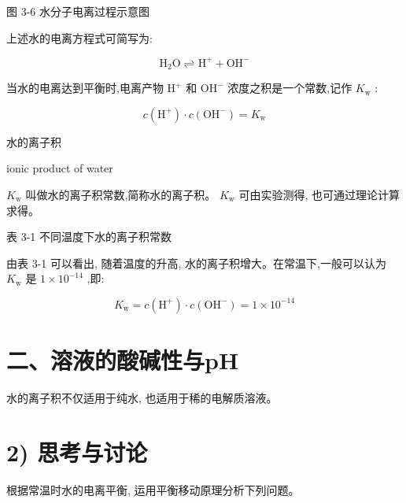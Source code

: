 \documentclass[10pt]{article}
\begin{document}
图 3-6 水分子电离过程示意图

上述水的电离方程式可简写为:

\[
{\mathrm{H}}_{2}\mathrm{O} \rightleftharpoons {\mathrm{H}}^{ + } + {\mathrm{{OH}}}^{ - }
\]

当水的电离达到平衡时,电离产物 \({\mathrm{H}}^{ + }\) 和 \({\mathrm{{OH}}}^{ - }\) 浓度之积是一个常数,记作 \({K}_{\mathrm{w}}\) :

\[
c\left( {\mathrm{H}}^{ + }\right) \cdot c\left( {\mathrm{{OH}}}^{ - }\right) = {K}_{\mathrm{w}}
\]

\begin{mdframed}

水的离子积

ionic product of water

\end{mdframed}

\({K}_{\mathrm{w}}\) 叫做水的离子积常数,简称水的离子积。 \({K}_{\mathrm{w}}\) 可由实验测得, 也可通过理论计算求得。

表 3-1 不同温度下水的离子积常数

\begin{center}
\end{center}

由表 3-1 可以看出, 随着温度的升高, 水的离子积增大。在常温下,一般可以认为 \({K}_{\mathrm{w}}\) 是 \(1 \times {10}^{-{14}}\) ,即:

\[
{K}_{\mathrm{w}} = c\left( {\mathrm{H}}^{ + }\right) \cdot c\left( {\mathrm{{OH}}}^{ - }\right) = 1 \times {10}^{-{14}}
\]

\section*{二、溶液的酸碱性与pH}

水的离子积不仅适用于纯水, 也适用于稀的电解质溶液。

\section*{2) 思考与讨论}

根据常温时水的电离平衡, 运用平衡移动原理分析下列问题。
\end{document}
